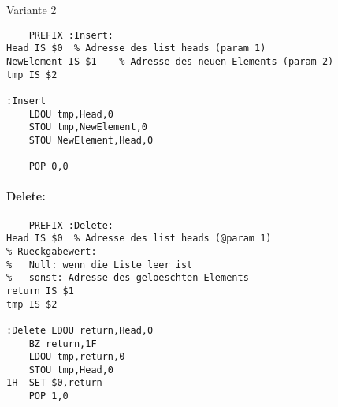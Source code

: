 Variante 2
\begin{lstlisting}
	PREFIX :Insert:
Head IS $0	% Adresse des list heads (param 1)
NewElement IS $1	% Adresse des neuen Elements (param 2)
tmp IS $2

:Insert
	LDOU tmp,Head,0
	STOU tmp,NewElement,0
	STOU NewElement,Head,0
	
	POP 0,0
\end{lstlisting}

\paragraph{Delete:} 

\begin{lstlisting}
	PREFIX :Delete:
Head IS $0	% Adresse des list heads (@param 1)
% Rueckgabewert: 
%	Null: wenn die Liste leer ist
%	sonst: Adresse des geloeschten Elements
return IS $1
tmp IS $2

:Delete LDOU return,Head,0
	BZ return,1F
	LDOU tmp,return,0
	STOU tmp,Head,0
1H	SET $0,return
	POP 1,0
\end{lstlisting}